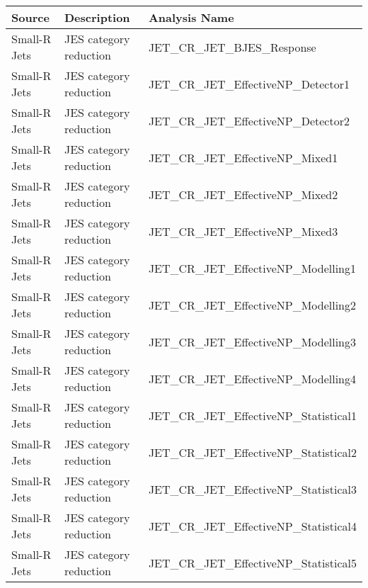 \begin{table}[!hp]
  \centering
  \footnotesize
  \begin{center}
    \begin{tabular}{|l|l|l|}
      \hline
      Source        & Description                     & Analysis Name                                       \\ \hline
      Small-R Jets  & JES category reduction            &  JET\_CR\_JET\_BJES\_Response                            \\
      Small-R Jets  & JES category reduction            &  JET\_CR\_JET\_EffectiveNP\_Detector1                    \\
      Small-R Jets  & JES category reduction            &  JET\_CR\_JET\_EffectiveNP\_Detector2                    \\
      Small-R Jets  & JES category reduction            &  JET\_CR\_JET\_EffectiveNP\_Mixed1                       \\
      Small-R Jets  & JES category reduction            &  JET\_CR\_JET\_EffectiveNP\_Mixed2                       \\
      Small-R Jets  & JES category reduction            &  JET\_CR\_JET\_EffectiveNP\_Mixed3                       \\
      Small-R Jets  & JES category reduction            &  JET\_CR\_JET\_EffectiveNP\_Modelling1                   \\
      Small-R Jets  & JES category reduction            &  JET\_CR\_JET\_EffectiveNP\_Modelling2                   \\
      Small-R Jets  & JES category reduction            &  JET\_CR\_JET\_EffectiveNP\_Modelling3                   \\
      Small-R Jets  & JES category reduction            &  JET\_CR\_JET\_EffectiveNP\_Modelling4                   \\
      Small-R Jets  & JES category reduction            &  JET\_CR\_JET\_EffectiveNP\_Statistical1                 \\
      Small-R Jets  & JES category reduction            &  JET\_CR\_JET\_EffectiveNP\_Statistical2                 \\
      Small-R Jets  & JES category reduction            &  JET\_CR\_JET\_EffectiveNP\_Statistical3                 \\
      Small-R Jets  & JES category reduction            &  JET\_CR\_JET\_EffectiveNP\_Statistical4                 \\
      Small-R Jets  & JES category reduction            &  JET\_CR\_JET\_EffectiveNP\_Statistical5                 \\

\end{tabular}
\end{center}
\end{table}
